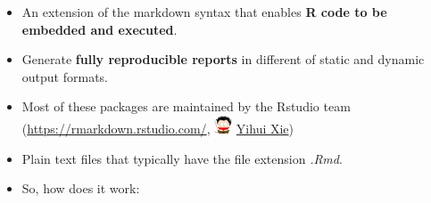 \documentclass[]{article}
\begin{document}
\begin{itemize}
\item
  An extension of the markdown syntax that enables \textbf{R code to be
  embedded and executed}.
\item
  Generate \textbf{fully reproducible reports} in different of static
  and dynamic output formats.
\item
  Most of these packages are maintained by the Rstudio team
  (\url{https://rmarkdown.rstudio.com/},
  \includegraphics[width=0.20833in,height=\textheight]{../figures/yihui.png}
  \href{https://yihui.name/}{Yihui Xie})
\item
  Plain text files that typically have the file extension \emph{.Rmd}.
\item
  So, how does it work:


\end{itemize}
\end{document}
